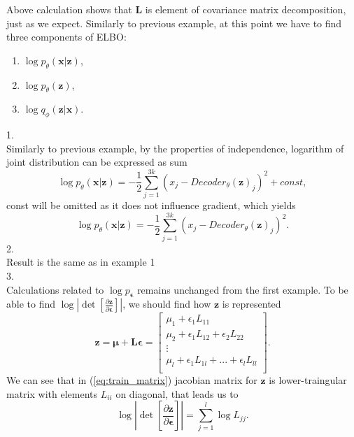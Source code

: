 \documentclass[10pt]{article}
\begin{document}
Above calculation shows that $\textbf{L}$ is element of covariance matrix decomposition, just as we expect.
Similarly to previous example, at this point we have to find three components of ELBO:
\begin{enumerate}
    \item $\log p_{\theta }(\textbf{x}|\textbf{z})$,
    \item $  \log p_{\theta }(\textbf{z})$,
    \item $\log q_{\phi }(\textbf{z}|\textbf{x})$.
\end{enumerate}
1. \\
Similarly to previous example, by the properties of independence, logarithm of joint distribution can be expressed as sum
\begin{equation}
     \log p_{\theta}(\textbf{x} | \textbf{z}) = 
     -\frac{1}{2}\sum_{j=1}^{3k}( x_j - Decoder_{\theta}(\textbf{z} )_j )^2 + const,
\end{equation}
const will be omitted as it does not influence gradient, which yields 
\begin{equation}
     \log p_{\theta}(\textbf{x} | \textbf{z}) = 
     -\frac{1}{2}\sum_{j=1}^{3k}( x_j - Decoder_{\theta}(\textbf{z} )_j )^2.
\end{equation}
2. \\
Result is the same as in example 1 \\
3. \\ 
Calculations related to  $\log p_{\bm{\epsilon}}$ remains unchanged from the first example. To be able to find
$\log \left| \det \left[\frac{\partial \textbf{z} }{\partial \bm{\epsilon}} \right] \right|$, we should find how $\textbf{z}$ is represented
\begin{equation} \label{eq:train_matrix}
   \textbf{z} =  \bm{\mu} + \textbf{L}\bm{\epsilon} = 
\begin{bmatrix}
    \mu_1 + \epsilon_1 L_{11} \\
     \mu_2 + \epsilon_1 L_{12} + \epsilon_2 L_{22} \\
     \vdots \\ 
     \mu_l + \epsilon_1 L_{1l} + ... + \epsilon_l L_{ll} \\
\end{bmatrix}
.
\end{equation}
We can see that in (\ref{eq:train_matrix})  jacobian matrix  for $\textbf{z}$ is lower-traingular matrix with elements $L_{ii}$ on diagonal, that leads us to 
\begin{equation}
      \log \left| \det \left[\frac{\partial \textbf{z} }{\partial \bm{\epsilon}} \right] \right| 
    =  \sum_{j=1}^{l} \log L_{jj}.
\end{equation}
\end{document}
